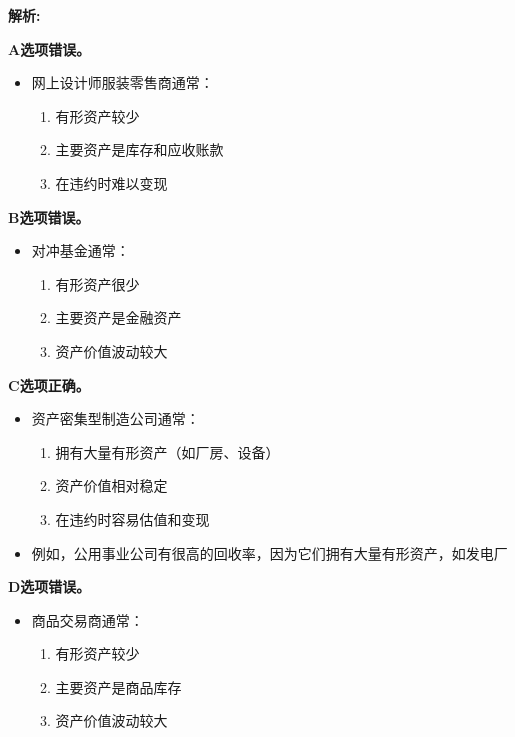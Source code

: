 \documentclass{article}
\newenvironment{explanation}
{\textbf{解析:}\par}
{\par}
\begin{document}
\begin{explanation}
    \textbf{A选项错误。}
    \begin{itemize}
        \item 网上设计师服装零售商通常：
        \begin{enumerate}
            \item 有形资产较少
            \item 主要资产是库存和应收账款
            \item 在违约时难以变现
        \end{enumerate}
    \end{itemize}
    
    \textbf{B选项错误。}
    \begin{itemize}
        \item 对冲基金通常：
        \begin{enumerate}
            \item 有形资产很少
            \item 主要资产是金融资产
            \item 资产价值波动较大
        \end{enumerate}
    \end{itemize}
    
    \textbf{C选项正确。}
    \begin{itemize}
        \item 资产密集型制造公司通常：
        \begin{enumerate}
            \item 拥有大量有形资产（如厂房、设备）
            \item 资产价值相对稳定
            \item 在违约时容易估值和变现
        \end{enumerate}
        \item 例如，公用事业公司有很高的回收率，因为它们拥有大量有形资产，如发电厂
    \end{itemize}
    
    \textbf{D选项错误。}
    \begin{itemize}
        \item 商品交易商通常：
        \begin{enumerate}
            \item 有形资产较少
            \item 主要资产是商品库存
            \item 资产价值波动较大
        \end{enumerate}
    \end{itemize}
\end{explanation}
\end{document}
